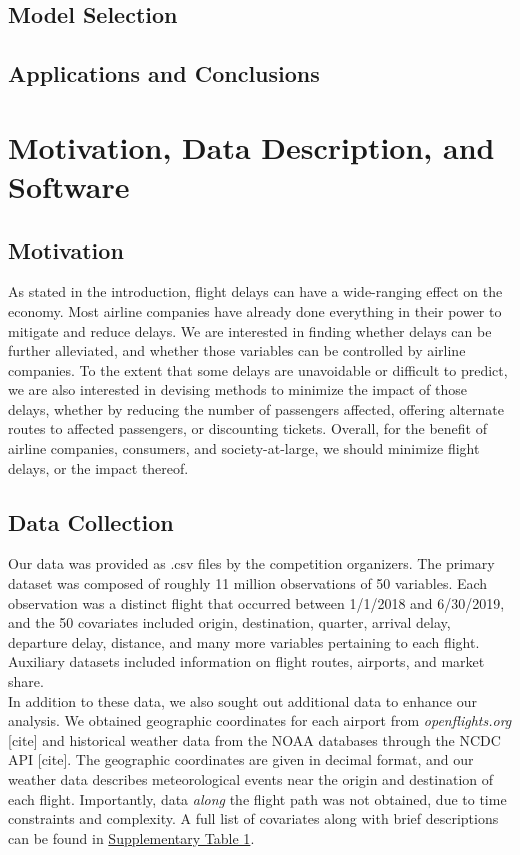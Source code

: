 \documentclass[12pt, a4paper]{book}
\newcommand\tab[1][1cm]{\hspace*{#1}}
\begin{document}
	\section{Model Selection}
	\section{Applications and Conclusions}
	
\chapter{Motivation, Data Description, and Software}
	\section{Motivation}
	\tab As stated in the introduction, flight delays can have a wide-ranging effect on the economy. Most airline companies have already done everything in their power to mitigate and reduce delays. We are interested in finding whether delays can be further alleviated, and whether those variables can be controlled by airline companies. To the extent that some delays are unavoidable or difficult to predict, we are also interested in devising methods to minimize the impact of those delays, whether by reducing the number of passengers affected, offering alternate routes to affected passengers, or discounting tickets. Overall, for the benefit of airline companies, consumers, and society-at-large, we should minimize flight delays, or the impact thereof. 
	\section{Data Collection}
	\tab Our data was provided as .csv files by the competition organizers. The primary dataset was composed of roughly 11 million observations of 50 variables. Each observation was a distinct flight that occurred between 1/1/2018 and 6/30/2019, and the 50 covariates included origin, destination, quarter, arrival delay, departure delay, distance, and many more variables pertaining to each flight. Auxiliary datasets included information on flight routes, airports, and market share. \\
	\tab In addition to these data, we also sought out additional data to enhance our analysis. We obtained geographic coordinates for each airport from \textit{openflights.org} [cite] and historical weather data from the NOAA databases through the NCDC API [cite]. The geographic coordinates are given in decimal format, and our weather data describes meteorological events near the origin and destination of each flight. Importantly, data \textit{along} the flight path was not obtained, due to time constraints and complexity. A full list of covariates along with brief descriptions can be found in \underline{Supplementary Table 1}. 
\end{document}
